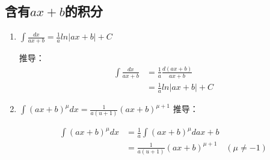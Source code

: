 \subsection{含有$ax+b$的积分}
\begin{enumerate}
	\item $\int \frac{dx}{ax+b}=\frac{1}{a}ln|ax+b|+C$
	
		推导：
		\begin{equation}
			\label{eq:adv1}
			\begin{split}
				\int \frac{dx}{ax+b} &=\frac{1}{a}\frac{d(ax+b)}{ax+b}\\
				&=\frac{1}{a}ln|ax+b|+C
			\end{split}
		\end{equation}
		\item $\int(ax+b)^{\mu}dx=\frac{1}{a(u+1)}(ax+b)^{\mu+1}$
		推导：
	
			\begin{align}
				\label{eq:adv2}
				\int(ax+b)^{\mu}dx&=\frac{1}{a}\int(ax+b)^{\mu}d{ax+b}\\
				&=\frac{1}{a(u+1)}(ax+b)^{\mu+1}\quad(\mu\neq -1)
			\end{align}


\end{enumerate}
